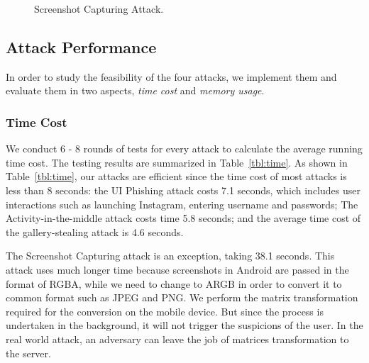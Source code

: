 \documentclass[letterpaper,12pt]{article}
\begin{document}
\begin{figure}[t]
\begin{subfigure}[b]{0.31\textwidth}
                \caption{}
        \end{subfigure}
         \caption{Screenshot Capturing Attack.}
         \vspace{-0.2cm}
         \label{fig:memory}
\end{figure}

\subsection{Attack Performance}\label{sec:attackperf}

In order to study the feasibility of the four attacks, we implement them and evaluate them in
two aspects, \emph{time cost} and \emph{memory usage}.

\subsubsection{Time Cost}
We conduct 6 - 8 rounds of tests for every attack to calculate the average
running time cost. The testing results are summarized
in Table~\ref{tbl:time}. As shown in Table~\ref{tbl:time}, our attacks
are efficient since the time cost of most attacks is less than 8 seconds:
the UI Phishing attack costs 7.1 seconds, which includes user
interactions such as launching Instagram, entering username and
passwords; The Activity-in-the-middle attack costs time 5.8 seconds; and
the average time cost of the gallery-stealing attack is 4.6 seconds.

The Screenshot Capturing attack is an exception, taking 38.1
seconds. This attack uses much longer time because screenshots in
Android are passed in the format of RGBA, while we need to change to
ARGB in order to convert it to common format such as JPEG and PNG.
We perform the matrix transformation required for the conversion on
the mobile device. But since the process is undertaken in the background, it will
not trigger the suspicions of the user. In the real world attack, an
adversary can leave the job of matrices transformation to the server.
\end{document}

